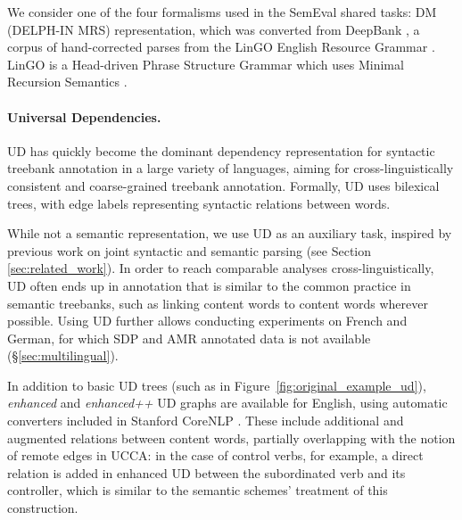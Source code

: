\documentclass[11pt,a4paper]{article}
\begin{document}
We consider one of the four formalisms used
in the SemEval shared tasks: DM (DELPH-IN MRS) representation, which was converted from 
DeepBank \cite{flickinger2012deepbank}, a corpus of hand-corrected parses from the LinGO
English Resource Grammar \cite{copestake2000open}.
LinGO is a Head-driven Phrase
Structure Grammar \cite[HPSG; ][]{pollard1994head}
which uses Minimal Recursion Semantics \cite{copestake2005minimal}.


\paragraph{Universal Dependencies.}\label{sec:ud}
UD \cite{nivre2016universal,11234/1-2515} has quickly become
the dominant dependency representation for
syntactic treebank annotation in a large variety of languages,
aiming for cross-linguistically consistent and coarse-grained treebank
annotation. Formally, UD uses bilexical trees, with edge labels 
representing syntactic relations between words.

While not a semantic representation,
we use UD as an auxiliary task,
inspired by previous work on joint syntactic and semantic parsing
(see Section \ref{sec:related_work}).
In order to reach comparable analyses cross-linguistically,
UD often ends up in annotation that is similar to the common practice
in semantic treebanks, such as linking content words to content words wherever possible.
Using UD further allows conducting experiments on French and German, 
for which SDP and AMR annotated data is not available (\S\ref{sec:multilingual}).

In addition to basic UD trees (such as in Figure~\ref{fig:original_example_ud}),
\textit{enhanced} and \textit{enhanced++} UD graphs are available for English,
using automatic converters included in Stanford CoreNLP \cite{SCHUSTER16.779}.
These include additional and augmented relations between content words,
partially overlapping with the notion of remote edges in UCCA:
in the case of control verbs, for example, a direct relation is added in enhanced UD
between the subordinated verb and its controller,
which is similar to the semantic schemes' treatment of this construction.
\end{document}
